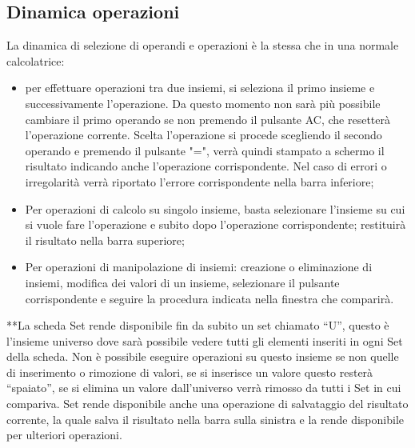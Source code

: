 \documentclass[a4paper,10pt]{article}
\begin{document}
            \subsection{Dinamica operazioni}
            La dinamica di selezione di operandi e operazioni è la stessa che in una normale calcolatrice: 
            \begin{itemize}
                \item per effettuare operazioni tra due insiemi, si seleziona il primo insieme e successivamente l’operazione. Da questo momento non sarà più possibile cambiare il primo operando se non premendo il pulsante AC, che resetterà l’operazione corrente. Scelta l’operazione si procede scegliendo il secondo operando e premendo il pulsante "=", verrà quindi stampato a schermo il risultato indicando anche l’operazione corrispondente. Nel caso di errori o irregolarità verrà riportato l’errore corrispondente nella barra inferiore;
                \item Per operazioni di calcolo su singolo insieme, basta selezionare l’insieme su cui si vuole fare l’operazione e subito dopo l’operazione corrispondente; restituirà il risultato nella barra superiore;
                \item Per operazioni di manipolazione di insiemi: creazione o eliminazione di insiemi, modifica dei valori di un insieme, selezionare il pulsante corrispondente e seguire la procedura indicata nella finestra che comparirà.
    
            \end{itemize}
    
            **La scheda Set rende disponibile fin da subito un set chiamato “U”, questo è l’insieme universo dove sarà possibile vedere tutti gli elementi inseriti in ogni Set della scheda. Non è possibile eseguire operazioni su questo insieme se non quelle di inserimento o rimozione di valori, se si inserisce un valore questo resterà “spaiato”, se si elimina un valore dall’universo verrà rimosso da tutti i Set in
            cui compariva.
            Set rende disponibile anche una operazione di salvataggio del risultato corrente, la quale salva il risultato
            nella barra sulla sinistra e la rende disponibile per ulteriori operazioni.
    
\end{document}
